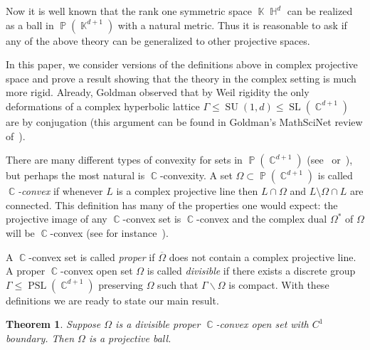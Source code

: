 \documentclass[12pt]{amsart}
\theoremstyle{plain}
\newtheorem{theorem}[proposition]{Theorem}
\theoremstyle{definition}
\theoremstyle{remark}
\begin{document}
Now it is well known that the rank one symmetric space $\operatorname{\mathbb{K}} \operatorname{\mathbb{H}}^d$ can be realized as a ball in $\operatorname{\mathbb{P}}(\operatorname{\mathbb{K}}^{d+1})$ with a natural metric. Thus it is reasonable to ask if any of the above theory can be generalized to other projective spaces.  

In this paper, we consider versions of the definitions above in complex projective space and prove a result showing that the theory in the complex setting is much more rigid. Already, Goldman observed that by Weil rigidity the only deformations of a complex hyperbolic lattice $\Gamma \leq \operatorname{SU}(1,d) \leq \operatorname{SL}(\operatorname{\mathbb{C}}^{d+1})$ are by conjugation (this argument can be found in Goldman's MathSciNet review of~\cite{K2011}). 

There are many different types of convexity for sets in $\operatorname{\mathbb{P}}(\operatorname{\mathbb{C}}^{d+1})$ (see~\cite{APS2004} or~\cite{H2007}), but perhaps the most natural is $\operatorname{\mathbb{C}}$-convexity. A set $\Omega \subset \operatorname{\mathbb{P}}(\operatorname{\mathbb{C}}^{d+1})$ is called \emph{$\operatorname{\mathbb{C}}$-convex} if whenever $L$ is a complex projective line then $L \cap \Omega$ and $L \setminus \Omega \cap L$ are connected. This definition has many of the properties one would expect: the projective image of any $\operatorname{\mathbb{C}}$-convex set is $\operatorname{\mathbb{C}}$-convex and the complex dual $\Omega^*$ of $\Omega$ will be $\operatorname{\mathbb{C}}$-convex (see for instance~\cite{APS2004}).

A $\operatorname{\mathbb{C}}$-convex set is called \emph{proper} if $\overline{\Omega}$ does not contain a complex projective line. A proper $\operatorname{\mathbb{C}}$-convex open set $\Omega$ is called \emph{divisible} if there exists a discrete group $\Gamma \leq \operatorname{PSL}(\operatorname{\mathbb{C}}^{d+1})$ preserving $\Omega$ such that $\Gamma \backslash \Omega$ is compact. With these definitions we are ready to state our main result.

\begin{theorem} 
\label{thm:main}
Suppose $\Omega$ is a divisible  proper $\operatorname{\mathbb{C}}$-convex open set with $C^1$ boundary. Then $\Omega$ is a projective ball.
\end{theorem}
\end{document}
